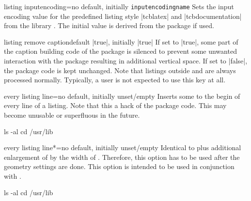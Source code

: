 \clearpage
\begin{docTcbKey}{listing inputencoding}{=}{no default, initially \texttt{\cs inputencodingname}}
  Sets the input encoding value for the predefined listing style |tcblatex|
  and |tcbdocumentation| from the library .
  The initial value is derived from the package  if used.
\end{docTcbKey}

\begin{docTcbKey}{listing remove caption}{}{default |true|, initially |true|}
If set to |true|, some part of the caption building code of the  package
is silenced to prevent some unwanted interaction with the  package resulting
in additional vertical space.
If set to |false|, the  package code is kept unchanged.
Note that listings outside  and
 are always processed normally.
Typically, a user is not expected to use this key at all.
\end{docTcbKey}

\begin{docTcbKey}{every listing line}{=}{no default, initially unset/empty}
Inserts some  to the begin of every line of a listing.
Note that this a hack of the  package code. This may become unusable
or superfluous in the future.
\begin{dispExample}

\begin{commandshell}
ls -al
cd /usr/lib
\end{commandshell}
\end{dispExample}
\end{docTcbKey}


\begin{docTcbKey}{every listing line*}{=}{no default, initially unset/empty}
Identical to  plus additional enlargement
of  by the width of . Therefore, this
option has to be used after the geometry settings are done.
This option is intended to be used in conjunction with .

\begin{dispExample}

\begin{commandshell}
ls -al
cd /usr/lib
\end{commandshell}
\end{dispExample}
\end{docTcbKey}

